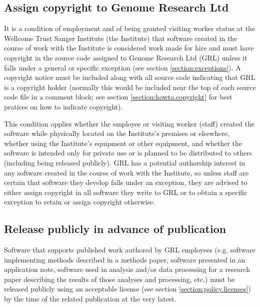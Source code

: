 \documentclass[10pt,a4paper]{article}
\begin{document}
\subsection{Assign copyright to Genome Research Ltd}
\label{section:policy.copyright}
\par It is a condition of employment and of being granted visiting worker status at the 
Wellcome Trust Sanger Institute (the Institute) that software created in the course 
of work with the Institute is considered work made for hire and must have 
copyright in the source code assigned to Genome Research Ltd (GRL) unless it 
falls under a general or specific exception (see section \ref{section:exceptions}). 
A copyright notice must be included along with all source code indicating that 
GRL is a copyright holder (normally this would be included near the top of each 
source code file in a comment block; see section \ref{section:howto.copyright} for best 
pratices on how to indicate copyright). 

\par This condition applies whether the employee or visiting worker (staff) 
created the software while physically located on the Institute's premises or 
elsewhere, whether using the Institute's equipment or other equipment, and 
whether the software is intended only for private use or is planned to be 
distributed to others (including being released publicly). GRL has a potential 
authorship interest in any software created in the course of work with the 
Institute, so unless staff are certain that software they develop falls 
under an exception, they are advised to either assign copyright in all software 
they write to GRL or to obtain a specific exception to retain or assign copyright 
otherwise.


\subsection{Release publicly in advance of publication}

\par Software that supports published work authored by GRL employees 
(e.g. software implementing methods described in a methods paper, software 
presented in an application note, software used in analysis and/or data 
processing for a research paper describing the results of those analyses and 
processing, etc.) must be released publicly using an acceptable license 
(see section \ref{section:policy.licenses}) by the time of the related publication 
at the very latest. 
\end{document}
